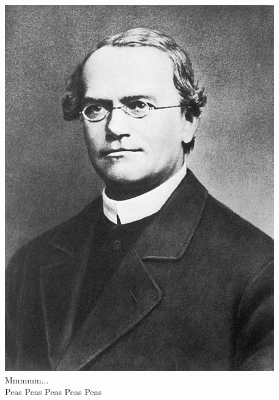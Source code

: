 \documentclass{beamer}
\begin{document}
\begin{frame}
\begin{columns}[T]
\begin{column}{0.6\textwidth}
		\end{column}
		\begin{column}{.4\textwidth}
			\includegraphics[keepaspectratio, width  =\textwidth]{img/mendel}
			\centering
			Mmmmm...\\
			Peas Peas Peas Peas Peas
		\end{column}
		
		
		
	\end{columns}
\end{frame}
\end{document}
